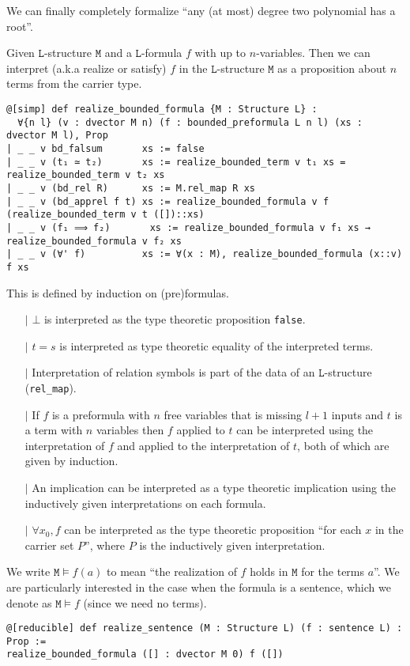 We can finally completely formalize
``any (at most) degree two polynomial has a root''.

\begin{dfn}

    Given $\texttt{L}$-structure $\texttt{M}$ and a $\texttt{L}$-formula $f$ with up to $n$-variables.
    Then we can interpret (a.k.a realize or satisfy) $f$ in the $\texttt{L}$-structure $\texttt{M}$ as a
    proposition about $n$ terms from the carrier type.

    \begin{lstlisting}
@[simp] def realize_bounded_formula {M : Structure L} :
  ∀{n l} (v : dvector M n) (f : bounded_preformula L n l) (xs : dvector M l), Prop
| _ _ v bd_falsum       xs := false
| _ _ v (t₁ ≃ t₂)       xs := realize_bounded_term v t₁ xs = realize_bounded_term v t₂ xs
| _ _ v (bd_rel R)      xs := M.rel_map R xs
| _ _ v (bd_apprel f t) xs := realize_bounded_formula v f (realize_bounded_term v t ([])::xs)
| _ _ v (f₁ ⟹ f₂)       xs := realize_bounded_formula v f₁ xs → realize_bounded_formula v f₂ xs
| _ _ v (∀' f)          xs := ∀(x : M), realize_bounded_formula (x::v) f xs \end{lstlisting}

  This is defined by induction on (pre)formulas.
  \begin{itemize}
    \item[$\vert$] $\bot$ is interpreted as the type theoretic proposition \texttt{false}.
    \item[$\vert$] $t = s$ is interpreted as type theoretic equality of the interpreted terms.
    \item[$\vert$] Interpretation of relation symbols is part of the data of an
          $\texttt{L}$-structure (\texttt{rel\_map}).
    \item[$\vert$] If $f$ is a preformula with $n$ free variables that is missing
          $l + 1$ inputs and $t$ is a term with $n$ variables
          then $f$ applied to $t$ can be interpreted using the interpretation of $f$ and
          applied to the interpretation of $t$, both of which are given by induction.
    \item[$\vert$] An implication can be interpreted as a type theoretic implication
          using the inductively given interpretations on each formula.
    \item[$\vert$] $\forall x_{0}, f$ can be interpreted as the type theoretic proposition
          ``for each $x$ in the carrier set $P$'',
          where $P$ is the inductively given interpretation.
  \end{itemize}

  We write $\texttt{M} \models f(a)$ to mean ``the realization of $f$ holds in $\texttt{M}$ for the terms $a$''.
  We are particularly interested in the case when the formula is a sentence,
  which we denote as $\texttt{M} \vDash f$ (since we need no terms).
  \begin{lstlisting}
@[reducible] def realize_sentence (M : Structure L) (f : sentence L) : Prop :=
realize_bounded_formula ([] : dvector M 0) f ([])\end{lstlisting}
\end{dfn}


